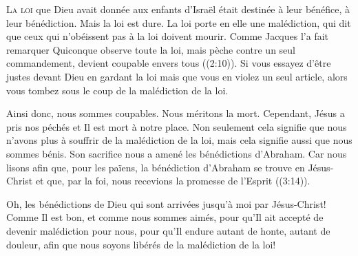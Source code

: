 





\lettrine{L}{a loi} que Dieu avait donnée aux enfants d'Israël
 était destinée à leur bénéfice, à leur bénédiction.
 Mais la loi est dure. La loi porte en elle une malédiction,
 qui dit que ceux qui n'obéissent pas à la loi doivent mourir.
 Comme Jacques l'a fait remarquer\frcolon{} 
 \Og Quiconque observe toute la loi, mais pèche contre un seul commandement,
 devient coupable envers tous \Fg{} ((2:10)).
 Si vous essayez d'être justes devant Dieu en gardant la loi
 mais que vous en violez un seul article,
 alors vous tombez sous le coup de la malédiction de la loi.

Ainsi donc, nous sommes coupables. Nous méritons la mort.
 Cependant, Jésus a pris nos péchés et Il est mort à notre place.
 Non seulement cela signifie que nous n'avons plus  à souffrir de la malédiction
 de la loi, mais cela signifie aussi que nous sommes bénis.
 Son sacrifice nous a amené les bénédictions d'Abraham.
 Car nous lisons\frcolon{} 
 \Og afin que, pour les païens, la bénédiction d'Abraham se trouve
 en Jésus-Christ et que, par la foi, nous recevions la promesse
 de l'Esprit \Fg{} ((3:14)).


Oh, les bénédictions de Dieu qui sont arrivées jusqu'à moi
 par Jésus-Christ! Comme Il est bon, et comme nous sommes aimés,
 pour qu'Il ait accepté de devenir malédiction pour nous,
 pour qu'Il endure autant de honte, autant de douleur,
 afin que nous soyons libérés de la malédiction de la loi!

